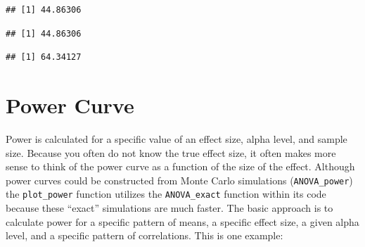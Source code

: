\documentclass[]{book}
\newenvironment{Shaded}{\begin{snugshade}}{\end{snugshade}}
\newcommand{\CommentTok}[1]{\textcolor[rgb]{0.56,0.35,0.01}{\textit{#1}}}
\newcommand{\KeywordTok}[1]{\textcolor[rgb]{0.13,0.29,0.53}{\textbf{#1}}}
\newcommand{\NormalTok}[1]{#1}
\newcommand{\OperatorTok}[1]{\textcolor[rgb]{0.81,0.36,0.00}{\textbf{#1}}}
\newcommand{\StringTok}[1]{\textcolor[rgb]{0.31,0.60,0.02}{#1}}
\begin{document}
\begin{Shaded}
\end{Shaded}

\begin{verbatim}
## [1] 44.86306
\end{verbatim}

\begin{Shaded}
\end{Shaded}

\begin{verbatim}
## [1] 44.86306
\end{verbatim}

\begin{Shaded}
\end{Shaded}

\begin{verbatim}
## [1] 64.34127
\end{verbatim}

\hypertarget{power-curve}{%
\chapter{Power Curve}\label{power-curve}}

Power is calculated for a specific value of an effect size, alpha level, and sample size. Because you often do not know the true effect size, it often makes more sense to think of the power curve as a function of the size of the effect. Although power curves could be constructed from Monte Carlo simulations (\texttt{ANOVA\_power}) the \texttt{plot\_power} function utilizes the \texttt{ANOVA\_exact} function within its code because these ``exact'' simulations are much faster. The basic approach is to calculate power for a specific pattern of means, a specific effect size, a given alpha level, and a specific pattern of correlations. This is one example:
\end{document}
